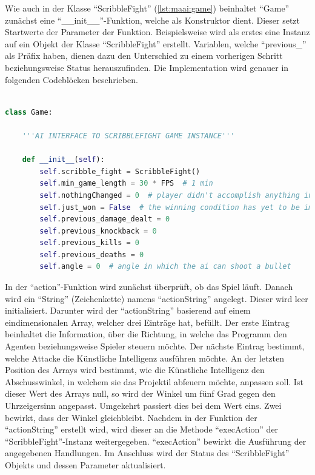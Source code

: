 Wie auch in der Klasse ``ScribbleFight'' (\ref{lst:maai:game}) beinhaltet ``Game'' zunächst eine ``\_\_init\_\_''-Funktion, welche als Konstruktor dient. Dieser setzt Startwerte der Parameter der Funktion. Beispielsweise wird als erstes eine Instanz auf ein Objekt der Klasse ``ScribbleFight'' erstellt. Variablen, welche ``previous\_'' als Präfix haben, dienen dazu den Unterschied zu einem vorherigen Schritt beziehungsweise Status herauszufinden. Die Implementation wird genauer in folgenden Codeblöcken beschrieben.


\begin{lstlisting}[language=Python,firstnumber=85]

class Game:

    '''AI INTERFACE TO SCRIBBLEFIGHT GAME INSTANCE'''

    def __init__(self):
        self.scribble_fight = ScribbleFight()
        self.min_game_length = 30 * FPS  # 1 min
        self.nothingChanged = 0  # player didn't accomplish anything in this timespan
        self.just_won = False  # the winning condition has yet to be implemented
        self.previous_damage_dealt = 0
        self.previous_knockback = 0
        self.previous_kills = 0
        self.previous_deaths = 0
        self.angle = 0  # angle in which the ai can shoot a bullet

\end{lstlisting}
In der ``action''-Funktion wird zunächst überprüft, ob das Spiel läuft. Danach wird ein ``String'' (Zeichenkette) namens ``actionString'' angelegt. Dieser wird leer initialisiert. Darunter wird der ``actionString'' basierend auf einem eindimensionalen Array, welcher drei Einträge hat, befüllt. Der erste Eintrag beinhaltet die Information, über die Richtung, in welche das Programm den Agenten beziehungsweise Spieler steuern möchte. Der nächste Eintrag bestimmt, welche Attacke die Künstliche Intelligenz ausführen möchte. An der letzten Position des Arrays wird bestimmt, wie die Künstliche Intelligenz den Abschusswinkel, in welchem sie das Projektil abfeuern möchte, anpassen soll. Ist dieser Wert des Arrays null, so wird der Winkel um fünf Grad gegen den Uhrzeigersinn angepasst. Umgekehrt passiert dies bei dem Wert eins. Zwei bewirkt, dass der Winkel gleichbleibt. Nachdem in der Funktion der ``actionString'' erstellt wird, wird dieser an die Methode ``execAction'' der ``ScribbleFight''-Instanz weitergegeben. ``execAction'' bewirkt die Ausführung der angegebenen Handlungen. Im Anschluss wird der Status des ``ScribbleFight'' Objekts und dessen Parameter aktualisiert.
